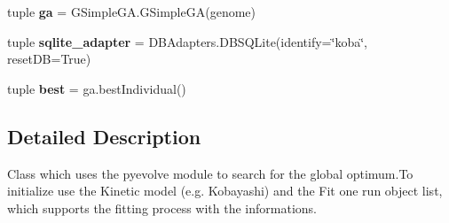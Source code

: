 \begin{DoxyCompactItemize}
\item 
\hypertarget{classEvolve_1_1GenericOpt_a2e293221cc94f69ed894945632c8b6c5}{tuple {\bfseries ga} = \-G\-Simple\-G\-A.\-G\-Simple\-G\-A(genome)}\label{classEvolve_1_1GenericOpt_a2e293221cc94f69ed894945632c8b6c5}

\item 
\hypertarget{classEvolve_1_1GenericOpt_a637d608afa03ce7a146c39022ab1b7ab}{tuple {\bfseries sqlite\-\_\-adapter} = \-D\-B\-Adapters.\-D\-B\-S\-Q\-Lite(identify=\char`\"{}koba\char`\"{}, reset\-D\-B=\-True)}\label{classEvolve_1_1GenericOpt_a637d608afa03ce7a146c39022ab1b7ab}

\item 
\hypertarget{classEvolve_1_1GenericOpt_a824d6cd86999c3322d569db608f32fc7}{tuple {\bfseries best} = ga.\-best\-Individual()}\label{classEvolve_1_1GenericOpt_a824d6cd86999c3322d569db608f32fc7}

\end{DoxyCompactItemize}


\subsection{\-Detailed \-Description}
\begin{DoxyVerb}Class which uses the pyevolve module to search for the global optimum.To initialize use the Kinetic model (e.g. Kobayashi) and the Fit one run object list, which supports the fitting process with the informations.\end{DoxyVerb}
 

